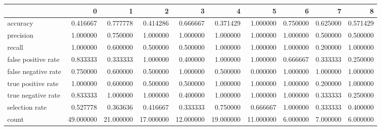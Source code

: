 \begin{tabular}{lrrrrrrrrr}
\toprule
{} &          0 &          1 &          2 &          3 &          4 &          5 &         6 &         7 &         8 \\
\midrule
accuracy            &   0.416667 &   0.777778 &   0.414286 &   0.666667 &   0.371429 &   1.000000 &  0.750000 &  0.625000 &  0.571429 \\
precision           &   1.000000 &   0.750000 &   1.000000 &   1.000000 &   1.000000 &   1.000000 &  1.000000 &  0.500000 &  0.500000 \\
recall              &   1.000000 &   0.600000 &   0.500000 &   0.500000 &   1.000000 &   1.000000 &  1.000000 &  0.200000 &  1.000000 \\
false positive rate &   0.833333 &   0.333333 &   1.000000 &   0.400000 &   1.000000 &   1.000000 &  0.666667 &  0.333333 &  0.250000 \\
false negative rate &   0.750000 &   0.600000 &   0.500000 &   1.000000 &   0.500000 &   0.000000 &  1.000000 &  1.000000 &  1.000000 \\
true positive rate  &   1.000000 &   0.600000 &   0.500000 &   0.500000 &   1.000000 &   1.000000 &  1.000000 &  0.200000 &  1.000000 \\
true negative rate  &   0.833333 &   1.000000 &   1.000000 &   0.400000 &   1.000000 &   1.000000 &  1.000000 &  0.333333 &  0.250000 \\
selection rate      &   0.527778 &   0.363636 &   0.416667 &   0.333333 &   0.750000 &   0.666667 &  1.000000 &  0.333333 &  0.400000 \\
count               &  49.000000 &  21.000000 &  17.000000 &  12.000000 &  19.000000 &  11.000000 &  6.000000 &  7.000000 &  6.000000 \\
\bottomrule
\end{tabular}
